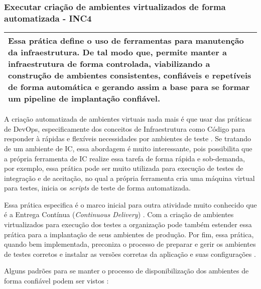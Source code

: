 \subsubsection{Executar criação de ambientes virtualizados de forma automatizada - INC4}
\label{sec:inc4}

\begin{table}[H]
\centering
\begin{tabular}{|p{130mm}|}
\hline
Essa prática define o uso de ferramentas para manutenção da infraestrutura. De tal modo que, permite manter a infraestrutura de forma controlada, viabilizando a construção de ambientes consistentes, confiáveis e repetíveis de forma automática e gerando assim a base para se formar um pipeline de implantação confiável.\\ 
\hline
\end{tabular}
\end{table}

A criação automatizada de ambientes virtuais nada mais é que usar das práticas de DevOps, especificamente dos conceitos de Infraestrutura como Código para responder à rápidas e flexíveis necessidades por ambientes de teste \cite{BRAGA2015}. Se tratando de um ambiente de IC, essa abordagem é muito interessante, pois possibilita que a própria ferramenta de IC realize essa tarefa de forma rápida e sob-demanda, por exemplo, essa prática pode ser muito utilizada para execução de testes de integração e de aceitação, no qual a própria ferramenta cria uma máquina virtual para testes, inicia os \textit{scripts} de teste de forma automatizada.

Essa prática especifica é o marco inicial para outra atividade muito conhecido que é a Entrega Contínua (\textit{Continuous Delivery}) \cite{WOOTTON2013}. Com a criação de ambientes virtualizados para execução dos testes a organização pode também estender essa prática para a implantação de seus ambientes de produção. Por fim, essa prática, quando bem implementada, preconiza o processo de preparar e gerir os ambientes de testes corretos e instalar as versões corretas da aplicação e suas configurações \cite{humble2010}.

Alguns padrões para se manter o processo de disponibilização dos ambientes de forma confiável podem ser vistos \cite{duvall2011}:

